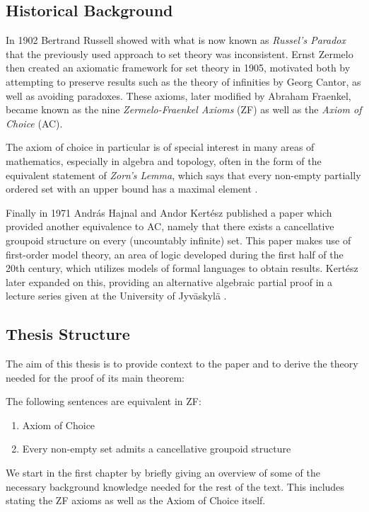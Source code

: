\documentclass[../../main.tex]{subfiles}
\begin{document}
\subsection*{Historical Background}

In 1902 Bertrand Russell showed with what is now known as \textit{Russel's Paradox} that the previously used approach to set theory was inconsistent.
Ernst Zermelo then created an axiomatic framework for set theory in 1905, motivated both by attempting to preserve results such as the theory of infinities by Georg Cantor, as well as avoiding paradoxes.
These axioms, later modified by Abraham Fraenkel, became known as the nine \textit{Zermelo-Fraenkel Axioms} (ZF) as well as the \textit{Axiom of Choice} (AC)\cite[pp.66-70, 75]{Gol17}.

The axiom of choice in particular is of special interest in many areas of mathematics, especially in algebra and topology, often in the form of the equivalent statement of \textit{Zorn's Lemma},
which says that every non-empty partially ordered set with an upper bound has a maximal element \cite{Jec78}.

Finally in 1971 András Hajnal and Andor Kertész published a paper \cite{Haj72} which provided another equivalence to AC, namely that there exists a cancellative groupoid structure on every (uncountably infinite) set.
This paper makes use of first-order model theory, an area of logic developed during the first half of the 20th century, which utilizes models of formal languages to obtain results.
Kertész later expanded on this, providing an alternative algebraic partial proof in a lecture series given at the University of Jyväskylä \cite{Ker75}.

\subsection*{Thesis Structure}

The aim of this thesis is to provide context to the paper \cite{Haj72} and to derive the theory needed for the proof of its main theorem:
\begin{theorem}
    The following sentences are equivalent in ZF:
    \begin{enumerate}
        \item Axiom of Choice
        \item Every non-empty set admits a cancellative groupoid structure
    \end{enumerate}
\end{theorem}
We start in the first chapter by briefly giving an overview of some of the necessary background knowledge needed for the rest of the text.
This includes stating the ZF axioms as well as the Axiom of Choice itself.
\end{document}

